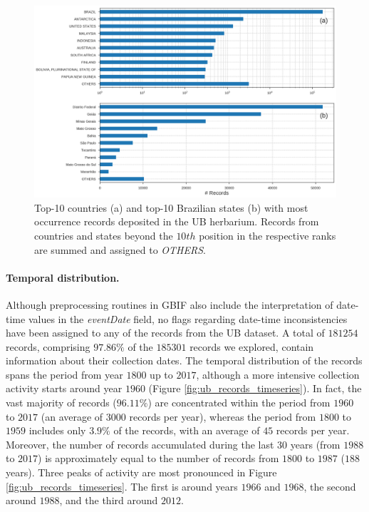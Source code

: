 \begin{figure}[!htb]
\centering
\includegraphics[width=\linewidth]{figures/recs_by_cntry_state.png}
\caption[Top-10 countries and Brazilian states with most occurrence records deposited in the UB herbarium]{Top-10 countries (a) and top-10 Brazilian states (b) with most occurrence records deposited in the UB herbarium. Records from countries and states beyond the $10th$ position in the respective ranks are summed and assigned to \textit{OTHERS}.}
\label{fig:recs_by_cntry_state}
\end{figure}

  
\paragraph*{Temporal distribution.}

Although preprocessing routines in GBIF also include the interpretation of date-time values in the \textit{eventDate} field, no flags regarding date-time inconsistencies have been assigned to any of the records from the UB dataset.
A total of $181254$ records, comprising $97.86\%$ of the $185301$ records we explored, contain information about their collection dates.
The temporal distribution of the records spans the period from year $1800$ up to $2017$, although a more intensive collection activity starts around year $1960$ (Figure \ref{fig:ub_records_timeseries}).
In fact, the vast majority of records ($96.11\%$) are concentrated within the period from $1960$ to $2017$ (an average of $3000$ records per year), whereas the period from $1800$ to $1959$ includes only $3.9\%$ of the records, with an average of $45$ records per year.
Moreover, the number of records accumulated during the last $30$ years (from $1988$ to $2017$) is approximately equal to the number of records from $1800$ to $1987$ ($188$ years). 
Three peaks of activity are most pronounced in Figure \ref{fig:ub_records_timeseries}.
The first is around years $1966$ and $1968$, the second around $1988$, and the third around $2012$.

